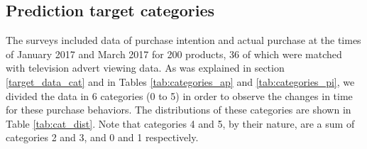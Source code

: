 \documentclass[review]{elsarticle}
\begin{document}
\subsection{Prediction target categories}
\label{cat_dist}

The surveys included data of purchase intention and actual purchase at the times of January 2017 and March 2017 for 200 products, 36 of which were matched with television advert viewing data. As was explained in section \ref{target_data_cat} and in Tables \ref{tab:categories_ap} and \ref{tab:categories_pi}, we divided the data in 6 categories (0 to 5) in order to observe the changes in time for these purchase behaviors. The distributions of these categories are shown in Table \ref{tab:cat_dist}. Note that categories 4 and 5, by their nature, are a sum of categories 2 and 3, and 0 and 1 respectively. 
\end{document}
